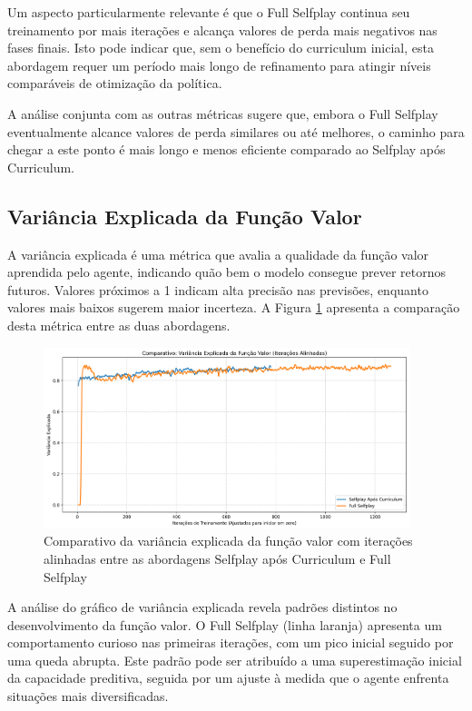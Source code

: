 Um aspecto particularmente relevante é que o Full Selfplay continua seu treinamento por mais iterações e alcança valores de perda mais negativos nas fases finais. Isto pode indicar que, sem o benefício do curriculum inicial, esta abordagem requer um período mais longo de refinamento para atingir níveis comparáveis de otimização da política.

A análise conjunta com as outras métricas sugere que, embora o Full Selfplay eventualmente alcance valores de perda similares ou até melhores, o caminho para chegar a este ponto é mais longo e menos eficiente comparado ao Selfplay após Curriculum.

\subsection{Variância Explicada da Função Valor}

A variância explicada é uma métrica que avalia a qualidade da função valor aprendida pelo agente, indicando quão bem o modelo consegue prever retornos futuros. Valores próximos a 1 indicam alta precisão nas previsões, enquanto valores mais baixos sugerem maior incerteza. A Figura \ref{fig:explained_variance} apresenta a comparação desta métrica entre as duas abordagens.

\begin{figure}[H]
    \centering
    \includegraphics[width=0.95\textwidth]{fig/graficos_trabalho/graficos_experimentos/geral/comparativo_variancia_explicada_alinhado.png}
    \caption{Comparativo da variância explicada da função valor com iterações alinhadas entre as abordagens Selfplay após Curriculum e Full Selfplay}
    \label{fig:explained_variance}
\end{figure}

A análise do gráfico de variância explicada revela padrões distintos no desenvolvimento da função valor. O Full Selfplay (linha laranja) apresenta um comportamento curioso nas primeiras iterações, com um pico inicial seguido por uma queda abrupta. Este padrão pode ser atribuído a uma superestimação inicial da capacidade preditiva, seguida por um ajuste à medida que o agente enfrenta situações mais diversificadas.

